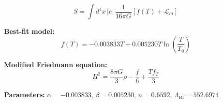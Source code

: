 
\begin{equation}
  S = \int d^4x \, |e| \, \frac{1}{16\pi G} \left[ f(T) + \mathcal{L}_m \right]
\end{equation}

\textbf{Best-fit model:}
\begin{equation}
  f(T) = -0.003833 T + 0.005230 T \ln\!\left(\frac{T}{T_0}\right)
\end{equation}

\textbf{Modified Friedmann equation:}
\begin{equation}
  H^2 = \frac{8\pi G}{3} \rho - \frac{f}{6} + \frac{T f_T}{3}
\end{equation}

\textbf{Parameters:}
$\alpha = -0.003833$, \quad
$\beta = 0.005230$, \quad
$n = 0.6592$, \quad
$\Lambda_{\text{BI}} = 552.6974$